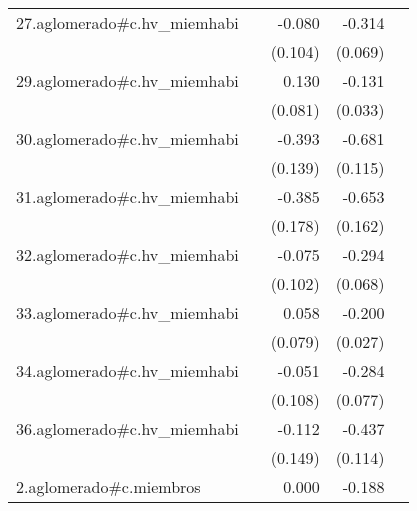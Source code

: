 {\begin{longtable}{l*{4}{D{.}{.}{-1}}}
\addlinespace
27.aglomerado#c.hv\_miemhabi&                     &      -0.080         &      -0.314\sym{***}&                     \\
            &                     &     (0.104)         &     (0.069)         &                     \\
\addlinespace
29.aglomerado#c.hv\_miemhabi&                     &       0.130         &      -0.131\sym{***}&                     \\
            &                     &     (0.081)         &     (0.033)         &                     \\
\addlinespace
30.aglomerado#c.hv\_miemhabi&                     &      -0.393\sym{**} &      -0.681\sym{***}&                     \\
            &                     &     (0.139)         &     (0.115)         &                     \\
\addlinespace
31.aglomerado#c.hv\_miemhabi&                     &      -0.385\sym{*}  &      -0.653\sym{***}&                     \\
            &                     &     (0.178)         &     (0.162)         &                     \\
\addlinespace
32.aglomerado#c.hv\_miemhabi&                     &      -0.075         &      -0.294\sym{***}&                     \\
            &                     &     (0.102)         &     (0.068)         &                     \\
\addlinespace
33.aglomerado#c.hv\_miemhabi&                     &       0.058         &      -0.200\sym{***}&                     \\
            &                     &     (0.079)         &     (0.027)         &                     \\
\addlinespace
34.aglomerado#c.hv\_miemhabi&                     &      -0.051         &      -0.284\sym{***}&                     \\
            &                     &     (0.108)         &     (0.077)         &                     \\
\addlinespace
36.aglomerado#c.hv\_miemhabi&                     &      -0.112         &      -0.437\sym{***}&                     \\
            &                     &     (0.149)         &     (0.114)         &                     \\
\addlinespace
2.aglomerado#c.miembros&                     &       0.000         &      -0.188\sym{***}&                     \\

\end{longtable}}
